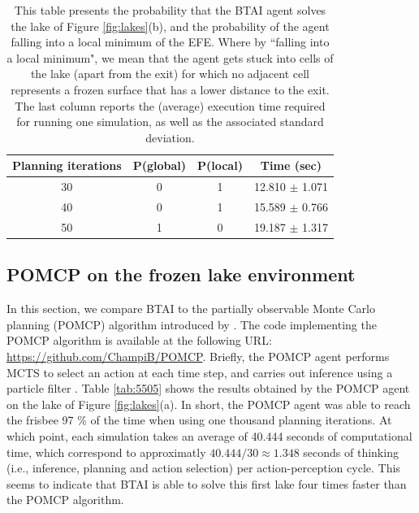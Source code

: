 \documentclass[twoside,11pt]{article}
\begin{document}
\begin{table}[H]
\centering
\begin{tabular}{ |c|c|c|c| }
 \hline
 Planning iterations & P(global) & P(local) & Time (sec) \\
 \hline
 30 & 0 & 1 & 12.810 $\pm$ 1.071 \\
 \hline
 40 & 0 & 1 & 15.589 $\pm$ 0.766 \\
 \hline
 50 & 1 & 0 & 19.187 $\pm$ 1.317 \\
 \hline
\end{tabular}
\caption{This table presents the probability that the BTAI agent solves the lake of Figure \ref{fig:lakes}(b), and the probability of the agent falling into a local minimum of the EFE. Where by ``falling into a local minimum", we mean that the agent gets stuck into cells of the lake (apart from the exit) for which no adjacent cell represents a frozen surface that has a lower distance to the exit. The last column reports the (average) execution time required for running one simulation, as well as the associated standard deviation.}
\label{tab:5504}
\end{table}

\subsection{POMCP on the frozen lake environment}

In this section, we compare BTAI to the partially observable Monte Carlo planning (POMCP) algorithm introduced by \citet{POMCP}. The code implementing the POMCP algorithm is available at the following URL: \url{https://github.com/ChampiB/POMCP}. Briefly, the POMCP agent performs MCTS \citep{Go,6145622,MuZero} to select an action at each time step, and carries out inference using a particle filter \citep{PARTICLE_FILTER}. Table \ref{tab:5505} shows the results obtained by the POMCP agent on the lake of Figure \ref{fig:lakes}(a). In short, the POMCP agent was able to reach the frisbee 97 \% of the time when using one thousand planning iterations. At which point, each simulation takes an average of 40.444 seconds of computational time, which correspond to approximatly $40.444/30 \approx 1.348$ seconds of thinking (i.e., inference, planning and action selection) per action-perception cycle. This seems to indicate that BTAI is able to solve this first lake four times faster than the POMCP algorithm.
\end{document}

